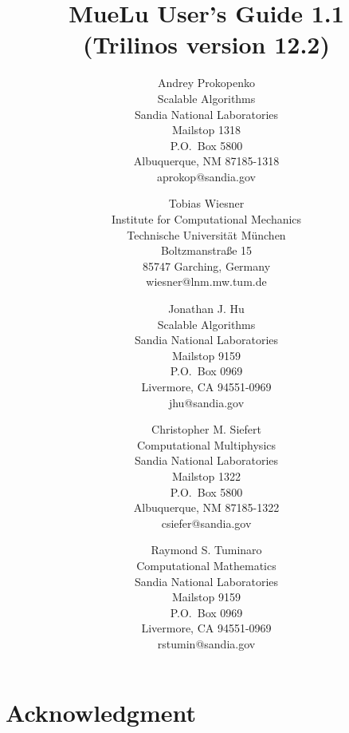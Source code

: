 \documentclass[pdf,12pt,report]{SANDreport}
\title{MueLu User's Guide 1.1 \\
(Trilinos version 12.2)}
\author{Andrey Prokopenko \\
  Scalable Algorithms \\
  Sandia National Laboratories\\
  Mailstop 1318 \\
  P.O.~Box 5800 \\
  Albuquerque, NM 87185-1318\\
  aprokop@sandia.gov\\
  \and
  Tobias Wiesner \\
  Institute for Computational Mechanics \\
  Technische Universit\"at M\"unchen\\
  Boltzmanstra\ss e 15 \\
  85747 Garching, Germany\\
  wiesner@lnm.mw.tum.de\\
  \and
  Jonathan J. Hu \\
  Scalable Algorithms \\
  Sandia National Laboratories\\
  Mailstop 9159 \\
  P.O.~Box 0969 \\
  Livermore, CA 94551-0969\\
  jhu@sandia.gov
  \and
  Christopher M. Siefert\\
  Computational Multiphysics\\
  Sandia National Laboratories\\
  Mailstop 1322 \\
  P.O.~Box 5800 \\
  Albuquerque, NM 87185-1322\\
  csiefer@sandia.gov
  \and
  Raymond S. Tuminaro\\
  Computational Mathematics\\
  Sandia National Laboratories\\
  Mailstop 9159 \\
  P.O.~Box 0969 \\
  Livermore, CA 94551-0969\\
  rstumin@sandia.gov
}
\date{}
\begin{document}
    \maketitle

    \begin{abstract}
	
    \end{abstract}


    \clearpage
    \chapter*{Acknowledgment}
	


    \cleardoublepage		%
    \tableofcontents
    \listoffigures
    \listoftables




\end{document}
